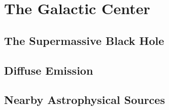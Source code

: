 \cleartooddpage[\thispagestyle{empty}]
\chapter{The Galactic Center}

\section{The Supermassive Black Hole}

\section{Diffuse Emission}

\section{Nearby Astrophysical Sources}
